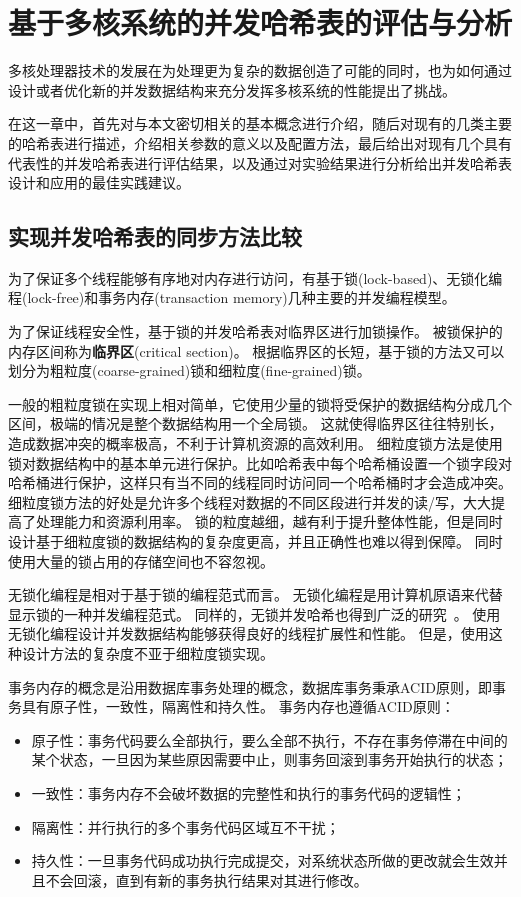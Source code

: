 \chapter{基于多核系统的并发哈希表的评估与分析}
\label{chap:chts}

多核处理器技术的发展在为处理更为复杂的数据创造了可能的同时，也为如何通过设计或者优化新的并发数据结构来充分发挥多核系统的性能提出了挑战。

在这一章中，首先对与本文密切相关的基本概念进行介绍，随后对现有的几类主要的哈希表进行描述，介绍相关参数的意义以及配置方法，最后给出对现有几个具有代表性的并发哈希表进行评估结果，以及通过对实验结果进行分析给出并发哈希表设计和应用的最佳实践建议。

\section{实现并发哈希表的同步方法比较}

为了保证多个线程能够有序地对内存进行访问，有基于锁(lock-based)、无锁化编程(lock-free)和事务内存(transaction memory)几种主要的并发编程模型。

为了保证线程安全性，基于锁的并发哈希表对临界区进行加锁操作。
被锁保护的内存区间称为\textbf{临界区}(critical section)。
根据临界区的长短，基于锁的方法又可以划分为粗粒度(coarse-grained)锁和细粒度(fine-grained)锁。

一般的粗粒度锁在实现上相对简单，它使用少量的锁将受保护的数据结构分成几个区间，极端的情况是整个数据结构用一个全局锁。
这就使得临界区往往特别长，造成数据冲突的概率极高，不利于计算机资源的高效利用。
细粒度锁方法是使用锁对数据结构中的基本单元进行保护。比如哈希表中每个哈希桶设置一个锁字段对哈希桶进行保护，这样只有当不同的线程同时访问同一个哈希桶时才会造成冲突。
细粒度锁方法的好处是允许多个线程对数据的不同区段进行并发的读/写，大大提高了处理能力和资源利用率。
锁的粒度越细，越有利于提升整体性能，但是同时设计基于细粒度锁的数据结构的复杂度更高，并且正确性也难以得到保障。
同时使用大量的锁占用的存储空间也不容忽视。

无锁化编程是相对于基于锁的编程范式而言。
无锁化编程是用计算机原语来代替显示锁的一种并发编程范式。
同样的，无锁并发哈希也得到广泛的研究~\cite{urcu, nonblocking,metreveli2012cphash}。
使用无锁化编程设计并发数据结构能够获得良好的线程扩展性和性能。
但是，使用这种设计方法的复杂度不亚于细粒度锁实现。

事务内存的概念是沿用数据库事务处理的概念，数据库事务秉承ACID原则，即事务具有原子性，一致性，隔离性和持久性。
事务内存也遵循ACID原则：
\begin{itemize}
  \item 原子性：事务代码要么全部执行，要么全部不执行，不存在事务停滞在中间的某个状态，一旦因为某些原因需要中止，则事务回滚到事务开始执行的状态；
  \item 一致性：事务内存不会破坏数据的完整性和执行的事务代码的逻辑性；
  \item 隔离性：并行执行的多个事务代码区域互不干扰；
  \item 持久性：一旦事务代码成功执行完成提交，对系统状态所做的更改就会生效并且不会回滚，直到有新的事务执行结果对其进行修改。
\end{itemize}

